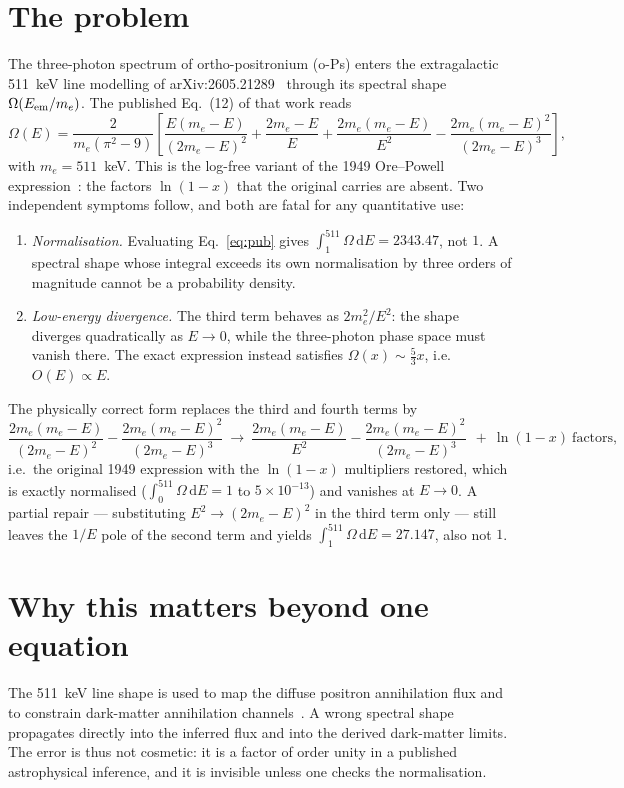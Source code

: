 \documentclass[11pt,a4paper]{article}
\begin{document}
\section{The problem}
The three-photon spectrum of ortho-positronium (o-Ps) enters the
extragalactic 511~keV line modelling of
arXiv:2605.21289~\cite{sy26} through its spectral shape
$\Omega(E_{\rm em}/m_e)$. The published Eq.~(12) of that work reads
\begin{equation}
\label{eq:pub}
\Omega(E) = \frac{2}{m_e(\pi^2-9)}\left[
\frac{E(m_e-E)}{(2m_e-E)^2} + \frac{2m_e-E}{E}
+ \frac{2m_e(m_e-E)}{E^2} - \frac{2m_e(m_e-E)^2}{(2m_e-E)^3}\right],
\end{equation}
with $m_e = 511$~keV. This is the log-free variant of the 1949
Ore--Powell expression~\cite{ore49}: the factors
$\ln(1-x)$ that the original carries are absent. Two independent
symptoms follow, and both are fatal for any quantitative use:
\begin{enumerate}
    \item \emph{Normalisation.} Evaluating Eq.~\eqref{eq:pub} gives
    $\int_{1}^{511}\Omega\,\mathrm{d}E = 2343.47$, not $1$. A spectral
    shape whose integral exceeds its own normalisation by three orders
    of magnitude cannot be a probability density.
    \item \emph{Low-energy divergence.} The third term behaves as
    $2m_e^2/E^2$: the shape diverges quadratically as $E\to 0$, while
    the three-photon phase space must vanish there. The exact
    expression instead satisfies $\Omega(x)\sim\tfrac{5}{3}x$, i.e.\
    $O(E)\propto E$.
\end{enumerate}
The physically correct form replaces the third and fourth terms by
\begin{equation}
\label{eq:corr}
\frac{2m_e(m_e-E)}{(2m_e-E)^2} - \frac{2m_e(m_e-E)^2}{(2m_e-E)^3}
\ \longrightarrow\
\frac{2m_e(m_e-E)}{E^2} - \frac{2m_e(m_e-E)^2}{(2m_e-E)^3}
\ \ +\ \ln(1-x)\ \text{factors},
\end{equation}
i.e.\ the original 1949 expression with the
$\ln(1-x)$ multipliers restored, which is exactly normalised
($\int_0^{511}\Omega\,\mathrm{d}E = 1$ to $5\times 10^{-13}$) and
vanishes at $E\to 0$. A partial repair --- substituting
$E^2\to(2m_e-E)^2$ in the third term only --- still leaves the
$1/E$ pole of the second term and yields
$\int_{1}^{511}\Omega\,\mathrm{d}E = 27.147$, also not $1$.

\section{Why this matters beyond one equation}
The 511~keV line shape is used to map the diffuse positron
annihilation flux and to constrain dark-matter annihilation
channels~\cite{sy26,yoneda25}. A wrong spectral shape propagates
directly into the inferred flux and into the derived dark-matter
limits. The error is thus not cosmetic: it is a factor of order
unity in a published astrophysical inference, and it is invisible
unless one checks the normalisation.
\end{document}
